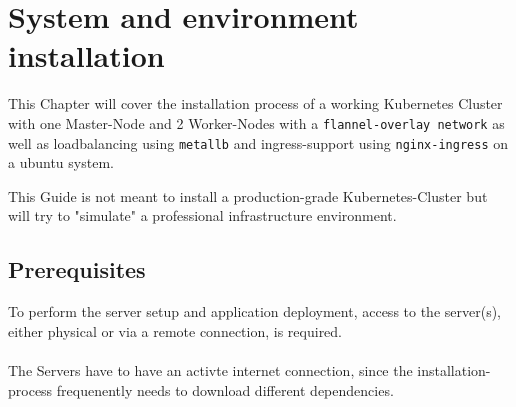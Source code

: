 \chapter{System and environment installation}

This Chapter will cover the installation process of a working Kubernetes Cluster with one Master-Node and 2 Worker-Nodes with a \texttt{flannel-overlay network} as well as loadbalancing using \texttt{metallb} and ingress-support using \texttt{nginx-ingress} on a ubuntu system.

This Guide is not meant to install a production-grade Kubernetes-Cluster but will try to "simulate" a professional infrastructure environment.

\section{Prerequisites}
To perform the server setup and application deployment, access to the server(s), either physical or via a remote connection, is required.
\\\\
The Servers have to have an activte internet connection, since the installation-process frequenently needs to download different dependencies.

